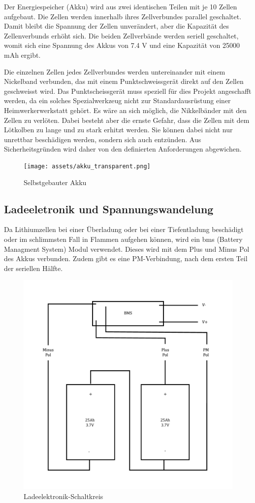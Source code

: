    
Der Energiespeicher (Akku) wird aus zwei identischen Teilen mit je 10 Zellen aufgebaut. Die Zellen werden innerhalb ihres Zellverbundes parallel geschaltet. Damit bleibt die Spannung der Zellen unverändert, aber die Kapazität des Zellenverbunds erhöht sich. Die beiden Zellverbände werden seriell geschaltet, womit sich eine Spannung des Akkus von 7.4 V und eine Kapazität von 25000 mAh ergibt.

Die einzelnen Zellen jedes Zellverbundes werden untereinander mit einem Nickelband verbunden, das mit einem Punktschweissgerät direkt auf den Zellen geschweisst wird. Das Punktscheissgerät muss speziell für dies Projekt angeschafft werden, da ein solches Spezialwerkzeug nicht zur Standardausrüstung einer Heimwerkerwerkstatt gehört. Es wäre an sich möglich, die Nikkelbänder mit den Zellen zu verlöten. Dabei besteht aber die ernste Gefahr, dass die Zellen mit dem Lötkolben zu lange und zu stark erhitzt werden. Sie können dabei nicht nur unrettbar beschädigen werden, sondern sich auch entzünden. Aus Sicherheitsgründen wird daher von den definierten Anforderungen abgewichen.
 \begin{figure}
 \centering
    \texttt{[image: assets/akku\_transparent.png]}
    \caption{Selbstgebauter Akku}
    \label{fig:enter-label}
\end{figure}
\subsection{Ladeeletronik und Spannungswandelung}

Da Lithiumzellen bei einer Überladung oder bei einer Tiefentladung beschädigt oder im schlimmsten Fall in Flammen aufgehen können, wird ein \ac{bms} (Battery Managment System) Modul verwendet. Dieses wird mit dem Plus und Minus Pol des Akkus verbunden. Zudem gibt es eine PM-Verbindung, nach dem ersten Teil der seriellen Hälfte.


\begin{figure}
    \centering
    \includegraphics[width=0.5\linewidth]{assets/bms_circuit_image.png}
    \caption{Ladeelektronik-Schaltkreis}
    \label{fig:enter-label}
\end{figure}

